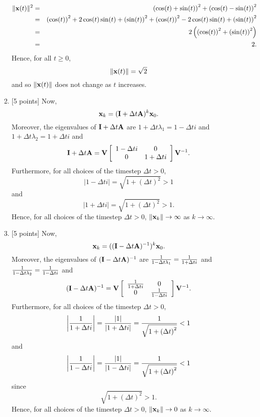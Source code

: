 \begin{solution}
\begin{enumerate}
\begin{eqnarray*}
\|{\bf x}(t)\|^2&=&\left(\cos(t)+\sin(t)\right)^2+\left(\cos(t)-\sin(t)\right)^2
\\
&=&\left(\cos(t)\right)^2+2\cos(t)\sin(t)+\left(\sin(t)\right)^2+\left(\cos(t)\right)^2-2\cos(t)\sin(t)+\left(\sin(t)\right)^2
\\
&=&2\left(\left(\cos(t)\right)^2+\left(\sin(t)\right)^2\right)
\\
&=&2.
\end{eqnarray*}
Hence, for all  $t\ge0$,
\[
\|{\bf x}(t)\|=\sqrt{2}
\]
and so $\|{\bf x}(t)\|$ does not change as $t$ increases.
\\
\item {[5 points]} Now,
\[
{\bf x}_k = ({\bf I}+\Delta t {\bf A})^k {\bf x}_0.
\]
Moreover, the eigenvalues of ${\bf I}+\Delta t {\bf A}$ are $1+\Delta t \lambda_1 = 1-\Delta t i$ and $1+\Delta t \lambda_2 = 1+\Delta ti$ and
\[
{\bf I}+\Delta t {\bf A}={\bf V} \left[\begin{array}{cc}1-\Delta ti & 0 \\ 0 & 1+\Delta ti\end{array}\right] {\bf V}^{-1}.
\]
Furthermore, for all choices of the timestep $\Delta t>0$,
\[
\left|1-\Delta t i\right|=\sqrt{1+\left(\Delta t\right)^2}>1
\]
and
\[
\left|1+\Delta t i\right|=\sqrt{1+\left(\Delta t\right)^2}>1.
\]
Hence, for all choices of the timestep $\Delta t>0$, $\|{\bf x}_k\|\rightarrow\infty$ as $k\to\infty$.
\\
\item {[5 points]} Now,
\[
{\bf x}_k = (({\bf I}-\Delta t {\bf A})^{-1})^k {\bf x}_0.
\]
Moreover, the eigenvalues of $({\bf I}-\Delta t {\bf A})^{-1}$ are ${1\over1-\Delta t \lambda_1} = {1\over1+\Delta t i}$ and ${1\over1-\Delta t \lambda_2} = {1\over1-\Delta ti}$ and
\[
({\bf I}-\Delta t {\bf A})^{-1}={\bf V} \left[\begin{array}{cc}{1\over1+\Delta t i} & 0 \\ 0 & {1\over1-\Delta ti}\end{array}\right] {\bf V}^{-1}.
\]
Furthermore, for all choices of the timestep $\Delta t>0$,
\[
\left|{1\over1+\Delta t i}\right|={\left|1\right|\over\left|1+\Delta t i\right|}={1\over\sqrt{1+\left(\Delta t\right)^2}}<1
\]
and
\[
\left|{1\over1-\Delta t i}\right|={\left|1\right|\over\left|1-\Delta t i\right|}={1\over\sqrt{1+\left(\Delta t\right)^2}}<1
\]
since
\[
\sqrt{1+\left(\Delta t\right)^2}>1.
\]
Hence, for all choices of the timestep $\Delta t>0$, $\|{\bf x}_k\|\rightarrow0$ as $k\to\infty$.
\end{enumerate}
\end{solution}







